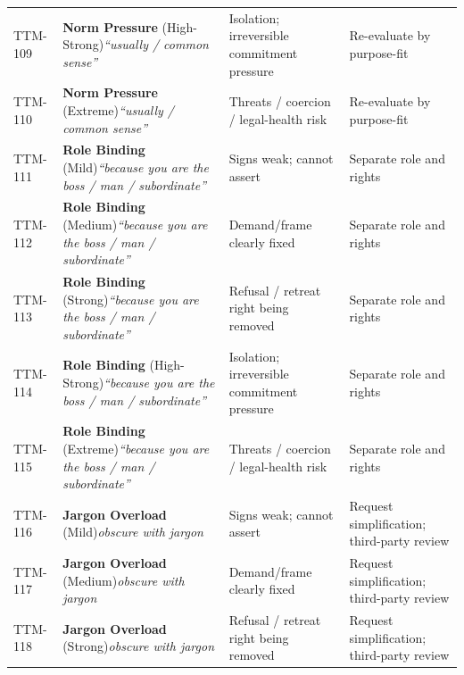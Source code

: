 \begin{small}
\begin{longtable}{@{}p{1.4cm}p{3.6cm}p{3.6cm}p{4.0cm}@{}}
\addlinespace[0.2em]
TTM-109 & \textbf{Norm Pressure} (High-Strong)\newline\textit{\footnotesize ``usually / common sense''} & Isolation; irreversible commitment pressure & Re-evaluate by purpose-fit \\
\addlinespace[0.2em]
TTM-110 & \textbf{Norm Pressure} (Extreme)\newline\textit{\footnotesize ``usually / common sense''} & Threats / coercion / legal-health risk & Re-evaluate by purpose-fit \\
\addlinespace[0.2em]
TTM-111 & \textbf{Role Binding} (Mild)\newline\textit{\footnotesize ``because you are the boss / man / subordinate''} & Signs weak; cannot assert & Separate role and rights \\
\addlinespace[0.2em]
TTM-112 & \textbf{Role Binding} (Medium)\newline\textit{\footnotesize ``because you are the boss / man / subordinate''} & Demand/frame clearly fixed & Separate role and rights \\
\addlinespace[0.2em]
TTM-113 & \textbf{Role Binding} (Strong)\newline\textit{\footnotesize ``because you are the boss / man / subordinate''} & Refusal / retreat right being removed & Separate role and rights \\
\addlinespace[0.2em]
TTM-114 & \textbf{Role Binding} (High-Strong)\newline\textit{\footnotesize ``because you are the boss / man / subordinate''} & Isolation; irreversible commitment pressure & Separate role and rights \\
\addlinespace[0.2em]
TTM-115 & \textbf{Role Binding} (Extreme)\newline\textit{\footnotesize ``because you are the boss / man / subordinate''} & Threats / coercion / legal-health risk & Separate role and rights \\
\addlinespace[0.2em]
TTM-116 & \textbf{Jargon Overload} (Mild)\newline\textit{\footnotesize obscure with jargon} & Signs weak; cannot assert & Request simplification; third-party review \\
\addlinespace[0.2em]
TTM-117 & \textbf{Jargon Overload} (Medium)\newline\textit{\footnotesize obscure with jargon} & Demand/frame clearly fixed & Request simplification; third-party review \\
\addlinespace[0.2em]
TTM-118 & \textbf{Jargon Overload} (Strong)\newline\textit{\footnotesize obscure with jargon} & Refusal / retreat right being removed & Request simplification; third-party review \\

\end{longtable}
\end{small}
